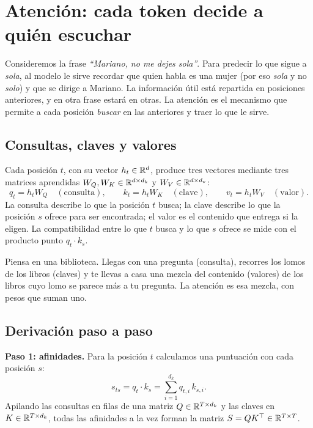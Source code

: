 \documentclass[11pt,letterpaper,oneside]{report}
\begin{document}
\section{Atención: cada token decide a quién escuchar}\label{sec:atencion}

Consideremos la frase \emph{``Mariano, no me dejes sola''}. Para predecir lo que sigue a \emph{sola}, al modelo le sirve recordar que quien habla es una mujer (por eso \emph{sola} y no \emph{solo}) y que se dirige a Mariano. La información útil está repartida en posiciones anteriores, y en otra frase estará en otras. La atención es el mecanismo que permite a cada posición \emph{buscar} en las anteriores y traer lo que le sirve.

\subsection{Consultas, claves y valores}

Cada posición $t$, con su vector $h_t\in\mathbb{R}^d$, produce tres vectores mediante tres matrices aprendidas $W_Q, W_K\in\mathbb{R}^{d\times d_k}$ y $W_V\in\mathbb{R}^{d\times d_v}$:
\[
  q_t = h_t W_Q \quad(\text{consulta}),\qquad k_t = h_t W_K \quad(\text{clave}),\qquad v_t = h_t W_V \quad(\text{valor}).
\]
La consulta describe lo que la posición $t$ busca; la clave describe lo que la posición $s$ ofrece para ser encontrada; el valor es el contenido que entrega si la eligen. La compatibilidad entre lo que $t$ busca y lo que $s$ ofrece se mide con el producto punto $q_t\cdot k_s$.

\begin{intuicion}
Piensa en una biblioteca. Llegas con una pregunta (consulta), recorres los lomos de los libros (claves) y te llevas a casa una mezcla del contenido (valores) de los libros cuyo lomo se parece más a tu pregunta. La atención es esa mezcla, con pesos que suman uno.
\end{intuicion}

\subsection{Derivación paso a paso}

\textbf{Paso 1: afinidades.} Para la posición $t$ calculamos una puntuación con cada posición $s$:
\[
  s_{ts} = q_t \cdot k_s = \sum_{i=1}^{d_k} q_{t,i}\,k_{s,i}.
\]
Apilando las consultas en filas de una matriz $Q\in\mathbb{R}^{T\times d_k}$ y las claves en $K\in\mathbb{R}^{T\times d_k}$, todas las afinidades a la vez forman la matriz $S = QK^\top \in\mathbb{R}^{T\times T}$.
\end{document}
